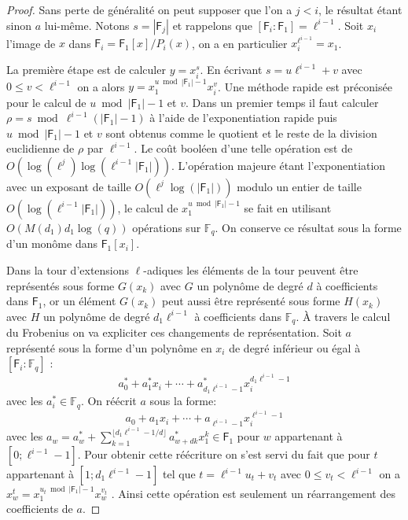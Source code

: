 \documentclass[10pt,a4paper]{book}
\theoremstyle{plain}
\theoremstyle{definition}
\theoremstyle{definition}
\theoremstyle{definition}
\theoremstyle{definition}
\theoremstyle{definition}
\theoremstyle{remark}
\theoremstyle{remark}
\theoremstyle{definition}
\begin{document}
\begin{proof}
Sans perte de généralité on peut supposer que l'on a $j<i$, le résultat étant sinon $a$ lui-même. Notons $s= |\mathsf{F}_j|$ et rappelons que $[\mathsf{F}_i:\mathsf{F}_1]=\ell^{i-1}$. Soit $x_i$ l'image de $x$ dans $\mathsf{F}_i=\mathsf{F}_1[x]/P_i(x)$, on a en particulier $x_i^{\ell^{i-1}}=x_1$.

La première étape est de calculer $y=x_i^s$. En écrivant $s=u\ell^{i-1}+v$ avec
$0 \leqslant v < \ell^{i-1}$ on a alors $y=x_1^{u \bmod |\mathsf{F}_1|-1}x_i^v$. 
Une méthode rapide est préconisée pour le calcul de $u \bmod |\mathsf{F}_1|-1$ 
et $v$. Dans un premier temps il faut calculer $\rho=s \bmod \ell^{i-1}(|\mathsf{F}_1|-1)$ à l'aide de l'exponentiation rapide puis $u \bmod |\mathsf{F}_1|-1$ et $v$ sont obtenus comme le quotient et le reste de la division euclidienne de $\rho$ par $\ell^{i-1}$. Le coût booléen d'une telle opération est de $O(\log(\ell^j)\log(\ell^{i-1}|\mathsf{F}_1|))$. L'opération majeure étant l'exponentiation avec un exposant de taille $O(\ell^{j}\log(|\mathsf{F}_1|))$ modulo un entier de taille $O(\log(\ell^{i-1}|\mathsf{F}_1|))$, le calcul de $x_1^{u \bmod |\mathsf{F}_1|-1}$ se fait en utilisant $O( M(d_1) d_1\log(q))$ opérations sur $\mathbb{F}_q$. On conserve ce résultat sous la forme d'un monôme dans $\mathsf{F}_1[x_i]$. 

Dans la tour d'extensions $\ell$-adiques les éléments de la tour peuvent être représentés sous forme $G(x_k)$ avec $G$ un polynôme de degré $d$ à coefficients dans $\mathsf{F}_1$, or un élément $G(x_k)$ peut aussi être représenté sous forme $H(x_k)$ avec $H$ un polynôme de degré $d_1\ell^{i-1}$ à coefficients dans $\mathbb{F}_q$. \`A travers le calcul du Frobenius on va expliciter ces changements de représentation. Soit $a$ représenté sous la forme d'un polynôme en $x_i$ de degré inférieur ou égal à $[\mathsf{F}_i:\mathbb{F}_q]$ : 
\begin{equation*}
a^*_0+a_1^*x_i+ \cdots + a^*_{d_1\ell^{i-1}-1}x_i^{d_1\ell^{i-1}-1}
\end{equation*}
avec les $a_i^* \in \mathbb{F}_q$. On réécrit $a$ sous la forme:
\begin{equation*}
a_0+a_1x_i+ \cdots + a_{\ell^{i-1}-1}x_i^{\ell^{i-1}-1}
\end{equation*}
avec les $a_w=a_w^* + \sum_{k=1}^{\lfloor d_1\ell^{i-1}-1/d \rfloor}a_{w+dk}^*x_1^k \in \mathsf{F}_1$ pour $w$ appartenant à $[0; \ell^{i-1}-1]$. Pour obtenir cette réécriture on s'est servi du fait que pour $t$ appartenant à $[1; d_1\ell^{i-1}-1]$ tel que $t=\ell^{i-1} u_t+v_t$ avec $0 \leqslant v_t<\ell^{i-1}$ on a $x_w^t=x_1^{u_t \bmod |\mathsf{F}_1|-1}x_w^{v_t}$ . Ainsi cette opération est seulement un réarrangement des coefficients de $a$.


\end{proof}
\end{document}
